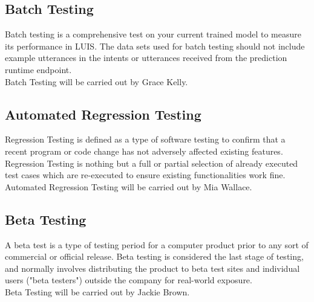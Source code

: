 \subsection{Batch Testing}
Batch testing is a comprehensive test on your current trained model to measure its performance in LUIS. The data sets used for batch testing should not include example utterances in the intents or utterances received from the prediction runtime endpoint.\\



Batch Testing will be carried out by Grace Kelly.



\subsection{Automated Regression Testing}
Regression Testing is defined as a type of software testing to confirm that a recent program or code change has not adversely affected existing features. Regression Testing is nothing but a full or partial selection of already executed test cases which are re-executed to ensure existing functionalities work fine.\\


Automated Regression Testing will be carried out by Mia Wallace.



\subsection{Beta Testing}
A beta test is a type of testing period for a computer product prior to any sort of commercial or official release. Beta testing is considered the last stage of testing, and normally involves distributing the product to beta test sites and individual users ("beta testers") outside the company for real-world exposure.\\

Beta Testing will be carried out by Jackie Brown.

